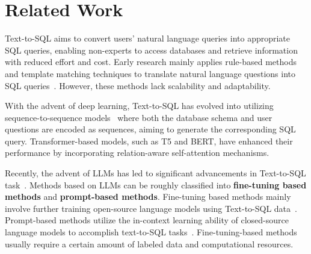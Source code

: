 \section{Related Work}

Text-to-SQL aims to convert users' natural language queries into appropriate SQL queries, enabling non-experts to access databases and retrieve information with reduced effort and cost. Early research mainly applies rule-based methods and template matching techniques to translate natural language questions into SQL queries~\citep{baik2020duoquest,stone2020athena++}. However, these methods lack scalability and adaptability.

 With the advent of deep learning, Text-to-SQL has evolved into utilizing sequence-to-sequence models~\citep{sutskever2014sequence} where both the database schema and user questions are encoded as sequences, aiming to generate the corresponding SQL query. Transformer-based models, such as T5 and BERT, have enhanced their performance by incorporating relation-aware self-attention mechanisms.

Recently, the advent of LLMs has led to significant advancements in Text-to-SQL task~\citep{rajkumar2022evaluating,ni2023lever,gao2024text}. 
Methods based on LLMs can be roughly classified into \textbf{fine-tuning based methods} and \textbf{prompt-based methods}.
Fine-tuning based methods mainly involve further training open-source language models using Text-to-SQL data~\citep{li2024codes,pourreza2024dts}. 
Prompt-based methods utilize the in-context learning ability of closed-source language models to accomplish text-to-SQL tasks~\citep{pourreza2024din,gao2024text,li2024dawn,qu2024before}.
Fine-tuning-based methods usually require a certain amount of labeled data and computational resources.

